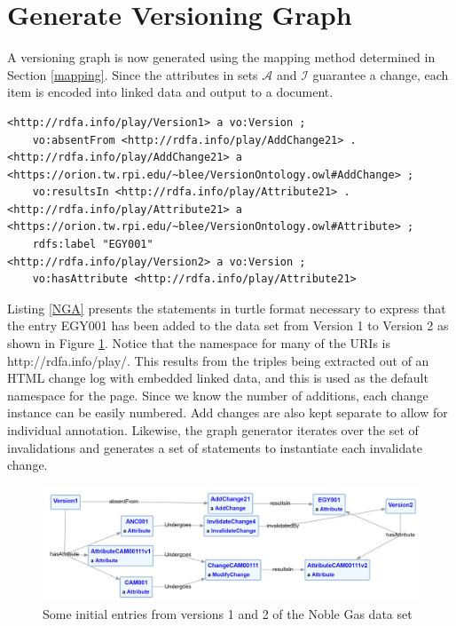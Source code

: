 \section{Generate Versioning Graph}

A versioning graph is now generated using the mapping method determined in Section \ref{mapping}.
Since the attributes in sets \(\mathcal{A}\) and \(\mathcal{I}\) guarantee a change, each item is encoded into linked data and output to a document.

\begin{lstlisting}[language=SPARQL, caption=Noble Gas Add in Turtle, label=NGA]
<http://rdfa.info/play/Version1> a vo:Version ;
	vo:absentFrom <http://rdfa.info/play/AddChange21> .
<http://rdfa.info/play/AddChange21> a <https://orion.tw.rpi.edu/~blee/VersionOntology.owl#AddChange> ;
	vo:resultsIn <http://rdfa.info/play/Attribute21> .
<http://rdfa.info/play/Attribute21> a <https://orion.tw.rpi.edu/~blee/VersionOntology.owl#Attribute> ;
	rdfs:label "EGY001"
<http://rdfa.info/play/Version2> a vo:Version ;
	vo:hasAttribute <http://rdfa.info/play/Attribute21>
\end{lstlisting}
Listing \ref{NGA} presents the statements in turtle format necessary to express that the entry EGY001 has been added to the data set from Version 1 to Version 2 as shown in Figure \ref{NobleGraph1}.
Notice that the namespace for many of the URIs is \textlangle http://rdfa.info/play/\textrangle.
This results from the triples being extracted out of an HTML change log with embedded linked data, and this is used as the default namespace for the page.
Since we know the number of additions, each change instance can be easily numbered.
Add changes are also kept separate to allow for individual annotation.
Likewise, the graph generator iterates over the set of invalidations and generates a set of statements to instantiate each invalidate change.

\begin{figure}
	\centering
	\includegraphics[scale=0.30]{figures/NobleVersion.png}
	\caption{Some initial entries from versions 1 and 2 of the Noble Gas data set}
	\label{NobleGraph1}
\end{figure}

